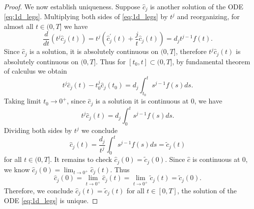 \documentclass{article}
\theoremstyle{definition}
\newcommand{\pr}[1]{ \left( #1 \right) }
\newcommand{\derivative}[1]{#1^{\prime}}
\begin{document}
\begin{proof}
    We now establish uniqueness. 
    Suppose $\hat{c}_j$ is another solution of the ODE \eqref{eq:1d_legs}. 
    Multiplying both sides of \eqref{eq:1d_legs} by %
    $t^j$ and reorganizing, for almost all $t\in(0,T]$ we have
    \[
        \frac{d}{dt} (t^j\hat{c}_j(t)) 
        = t^j \pr{ \derivative{\hat{c}}_j(t) + \frac{j}{t} \hat{c}_j(t) } 
        = d_j t^{j-1} f(t) .
    \]
    Since $\hat{c}_j$ is a solution, it is absolutely continuous on $(0,T]$, therefore $t^j\hat{c}_j(t)$ is absolutely continuous on $(0,T]$. 
    Thus for $[t_0,t] \subset (0,T]$, 
    by fundamental theorem of calculus we obtain
    \[
        t^j \hat{c}_j(t) - t_0^j \hat{c}_j(t_0) = d_j \int_{t_0}^t s^{j-1} f(s) ds.
    \]
    Taking limit $t_0 \to 0^+$, since $\hat{c}_j$ is a solution it is continuous at $0$, we have
    \[
        t^j \hat{c}_j(t) = d_j \int_{0}^t s^{j-1} f(s) ds.
    \]
    Dividing both sides by $t^j$ we conclude
    \begin{equation*}
       \hat{c}_j(t) = \frac{d_j}{t^j} \int^t_0 s^{j-1} f(s)ds = \tilde{c}_j(t) %
    \end{equation*}
    for all $t \in (0,T]$. 
    It remains to check $\hat{c}_j(0)=\tilde{c}_j(0)$. 
    Since $\hat{c}$ is continuous at $0$, we know $\hat{c}_j(0)=\lim_{t\to0^+}\hat{c}_j(t)$. Thus
     \begin{equation*}
        \hat{c}_j(0)
        = \lim_{t\to0^+} \hat{c}_j(t)
        = \lim_{t\to0^+} \tilde{c}_j(t)
        = \tilde{c}_j(0). 
    \end{equation*}
    Therefore, we conclude $\hat{c}_j(t) = \tilde{c}_j(t)$ for all $t\in[0,T]$, 
     the solution of the ODE \eqref{eq:1d_legs} is unique. 
    

\end{proof}
\end{document}
